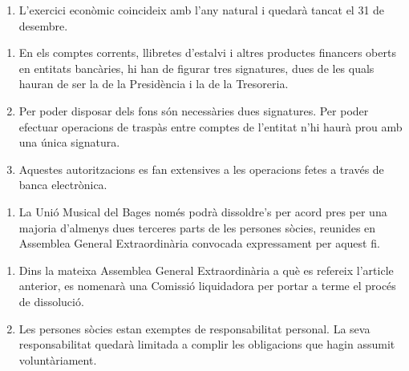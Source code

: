 \documentclass[11pt,a4paper]{article}
\newcommand{\UMB}{Unió Musical del Bages\xspace}
\newcommand{\AGE}{Assemblea General Extraordinària\xspace}
\begin{document}

\begin{enumerate}
    \item[] L'exercici econòmic coincideix amb l'any natural i quedarà tancat el 31 de desembre.
\end{enumerate}

\label{art:comptes-corrents}

\begin{enumerate}
    \item En els comptes corrents, llibretes d'estalvi i altres productes financers oberts en entitats bancàries, hi han de figurar tres signatures, dues de les quals hauran de ser la de la Presidència i la de la Tresoreria. 

    \item Per poder disposar dels fons són necessàries dues signatures. Per poder efectuar operacions de traspàs entre comptes de l'entitat n'hi haurà prou amb una única signatura.

    \item Aquestes autoritzacions es fan extensives a les operacions fetes a través de banca electrònica.
\end{enumerate}




\begin{enumerate}
    \item[] La \UMB només podrà dissoldre's per acord pres per una majoria d'almenys dues terceres parts de les persones sòcies, reunides en \AGE convocada expressament per aquest fi.
\end{enumerate}


\begin{enumerate}
    \item Dins la mateixa \AGE a què es refereix l'article anterior, es nomenarà una Comissió liquidadora per portar a terme el procés de dissolució.
    \item Les persones sòcies estan exemptes de responsabilitat personal. La seva responsabilitat quedarà limitada a complir les obligacions que hagin assumit voluntàriament.
\end{enumerate}
\end{document}
